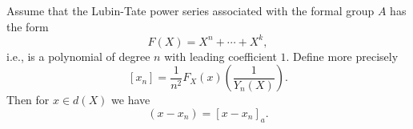 Assume that the Lubin-Tate power series associated with the formal group $A$ has the form
$$F(X) = X^n + \cdots + X^k,$$
i.e., is a polynomial of degree $n$ with leading coefficient $1$. Define more precisely
$$[x_n] = \frac{1}{n^2} F_X(x) \left( \frac{1}{Y_n(X)} \right).$$
Then for $x \in d(X)$ we have
$$(x - x_n) = [x - x_n]_a.$$
